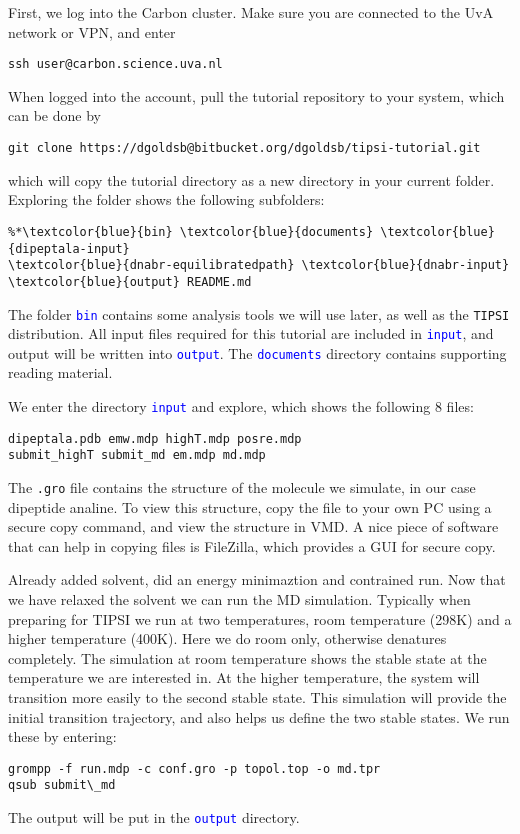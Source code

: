 \documentclass[]{article}
\begin{document}
First, we log into the Carbon cluster. Make sure you are connected to the UvA network or VPN, and enter
%
\begin{lstlisting}
ssh user@carbon.science.uva.nl
\end{lstlisting}
%
When logged into the account, pull the tutorial repository to your system, which can be done by
%
\begin{lstlisting}
git clone https://dgoldsb@bitbucket.org/dgoldsb/tipsi-tutorial.git
\end{lstlisting}
%
which will copy the tutorial directory as a new directory in your current folder. Exploring the folder shows the following subfolders:
%
\begin{lstlisting}
%*\textcolor{blue}{bin} \textcolor{blue}{documents} \textcolor{blue}{dipeptala-input} 
\textcolor{blue}{dnabr-equilibratedpath} \textcolor{blue}{dnabr-input} \textcolor{blue}{output} README.md
\end{lstlisting}
%
The folder \texttt{\textcolor{blue}{bin}} contains some analysis tools we will use later, as well as the \texttt{TIPSI} distribution. All input files required for this tutorial are included in \texttt{\textcolor{blue}{input}}, and output will be written into \texttt{\textcolor{blue}{output}}. The \texttt{\textcolor{blue}{documents}} directory contains supporting reading material.

We enter the directory \texttt{\textcolor{blue}{input}} and explore, which shows the following 8 files:
%
\begin{lstlisting}
dipeptala.pdb emw.mdp highT.mdp posre.mdp 
submit_highT submit_md em.mdp md.mdp
\end{lstlisting}
%
The \texttt{.gro} file contains the structure of the molecule we simulate, in our case dipeptide analine. To view this structure, copy the file to your own PC using a secure copy command, and view the structure in VMD. A nice piece of software that can help in copying files is FileZilla, which provides a GUI for secure copy.

Already added solvent, did an energy minimaztion and contrained run. Now that we have relaxed the solvent we can run the MD simulation. Typically when preparing for \textsc{TIPSI} we run at two temperatures, room temperature (298K) and a higher temperature (400K). Here we do room only, otherwise denatures completely. The simulation at room temperature shows the stable state at the temperature we are interested in. At the higher temperature, the system will transition more easily to the second stable state. This simulation will provide the initial transition trajectory, and also helps us define the two stable states. We run these by entering:
%
\begin{lstlisting}
grompp -f run.mdp -c conf.gro -p topol.top -o md.tpr
qsub submit\_md
\end{lstlisting}
%
The output will be put in the \texttt{\textcolor{blue}{output}} directory.
\end{document}
